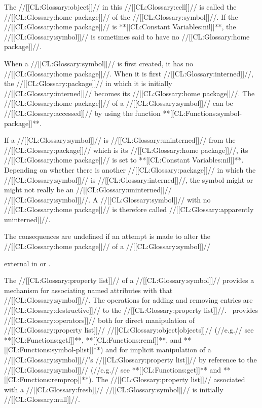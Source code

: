 
The //[[CL:Glossary:object]]// in this //[[CL:Glossary:cell]]// is called the //[[CL:Glossary:home package]]// of the //[[CL:Glossary:symbol]]//. If the //[[CL:Glossary:home package]]// is **[[CL:Constant Variables:nil]]**, the //[[CL:Glossary:symbol]]// is sometimes said to have no //[[CL:Glossary:home package]]//.

When a //[[CL:Glossary:symbol]]// is first created, it has no //[[CL:Glossary:home package]]//. When it is first //[[CL:Glossary:interned]]//, the //[[CL:Glossary:package]]// in which it is initially //[[CL:Glossary:interned]]// becomes its //[[CL:Glossary:home package]]//. The //[[CL:Glossary:home package]]// of a //[[CL:Glossary:symbol]]// can be //[[CL:Glossary:accessed]]// by using the function **[[CL:Functions:symbol-package]]**.

If a //[[CL:Glossary:symbol]]// is //[[CL:Glossary:uninterned]]// from the //[[CL:Glossary:package]]// which is its //[[CL:Glossary:home package]]//, its //[[CL:Glossary:home package]]// is set to **[[CL:Constant Variables:nil]]**. Depending on whether there is another //[[CL:Glossary:package]]// in which the //[[CL:Glossary:symbol]]// is //[[CL:Glossary:interned]]//, the symbol might or might not really be an //[[CL:Glossary:uninterned]]// //[[CL:Glossary:symbol]]//. A //[[CL:Glossary:symbol]]// with no //[[CL:Glossary:home package]]// is therefore called //[[CL:Glossary:apparently uninterned]]//.

The consequences are undefined if an attempt is made to alter the //[[CL:Glossary:home package]]// of a //[[CL:Glossary:symbol]]//

external in  or .


The //[[CL:Glossary:property list]]// of a //[[CL:Glossary:symbol]]// provides a mechanism for associating named attributes with that //[[CL:Glossary:symbol]]//. The operations for adding and removing entries are //[[CL:Glossary:destructive]]// to the //[[CL:Glossary:property list]]//. \clisp\ provides //[[CL:Glossary:operators]]// both for direct manipulation of //[[CL:Glossary:property list]]// //[[CL:Glossary:object|objects]]// (//e.g.// see **[[CL:Functions:getf]]**, **[[CL:Functions:remf]]**, and **[[CL:Functions:symbol-plist]]**) and for implicit manipulation of a //[[CL:Glossary:symbol]]//'s //[[CL:Glossary:property list]]// by reference to the //[[CL:Glossary:symbol]]// (//e.g.// see **[[CL:Functions:get]]** and **[[CL:Functions:remprop]]**). The //[[CL:Glossary:property list]]// associated with a //[[CL:Glossary:fresh]]// //[[CL:Glossary:symbol]]// is initially //[[CL:Glossary:null]]//.

